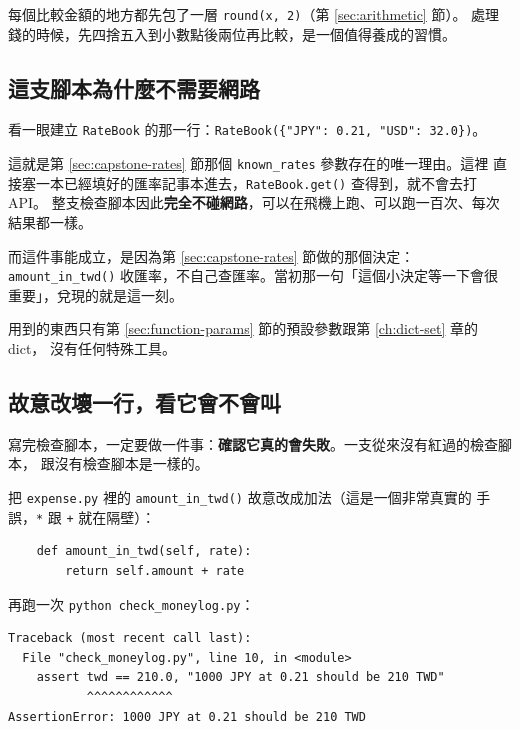 每個比較金額的地方都先包了一層 \texttt{round(x, 2)}（第 \ref{sec:arithmetic} 節）。
處理錢的時候，先四捨五入到小數點後兩位再比較，是一個值得養成的習慣。

\subsection*{這支腳本為什麼不需要網路}

看一眼建立 \texttt{RateBook} 的那一行：\texttt{RateBook(\{"JPY": 0.21, "USD": 32.0\})}。

這就是第 \ref{sec:capstone-rates} 節那個 \texttt{known\_rates} 參數存在的唯一理由。這裡
直接塞一本已經填好的匯率記事本進去，\texttt{RateBook.get()} 查得到，就不會去打 API。
整支檢查腳本因此\textbf{完全不碰網路}，可以在飛機上跑、可以跑一百次、每次結果都一樣。

而這件事能成立，是因為第 \ref{sec:capstone-rates} 節做的那個決定：\texttt{amount\_in\_twd()}
收匯率，不自己查匯率。當初那一句「這個小決定等一下會很重要」，兌現的就是這一刻。

用到的東西只有第 \ref{sec:function-params} 節的預設參數跟第 \ref{ch:dict-set} 章的 dict，
沒有任何特殊工具。


\subsection*{故意改壞一行，看它會不會叫}

寫完檢查腳本，一定要做一件事：\textbf{確認它真的會失敗}。一支從來沒有紅過的檢查腳本，
跟沒有檢查腳本是一樣的。

把 \texttt{expense.py} 裡的 \texttt{amount\_in\_twd()} 故意改成加法（這是一個非常真實的
手誤，\texttt{*} 跟 \texttt{+} 就在隔壁）：

\begin{verbatim}
    def amount_in_twd(self, rate):
        return self.amount + rate
\end{verbatim}

再跑一次 \texttt{python check\_moneylog.py}：

\begin{verbatim}
Traceback (most recent call last):
  File "check_moneylog.py", line 10, in <module>
    assert twd == 210.0, "1000 JPY at 0.21 should be 210 TWD"
           ^^^^^^^^^^^^
AssertionError: 1000 JPY at 0.21 should be 210 TWD
\end{verbatim}

